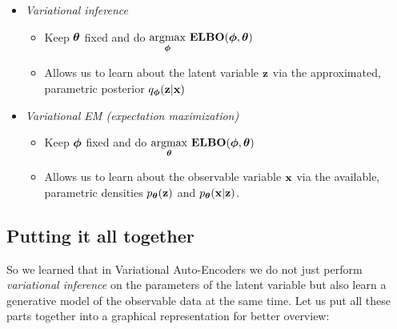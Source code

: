 \documentclass[11pt]{article}
\theoremstyle{definition}
\begin{document}
\begin{itemize}
	\item \textit{Variational inference}
	\begin{itemize}
		\item Keep $\boldsymbol{\theta}$ fixed and do $\underset{\boldsymbol{\phi}}{\mathrm{argmax}} \ \mathbf{ELBO} (\boldsymbol{\phi}, \boldsymbol{\theta})$
		\item Allows us to learn about the latent variable $\mathbf{z}$ via the approximated, parametric posterior $q_{\boldsymbol{\phi}}(\mathbf{z}|\mathbf{x})$
	\end{itemize}
	\item \textit{Variational EM (expectation maximization)}
	\begin{itemize}
		\item Keep $\boldsymbol{\phi}$ fixed and do $\underset{\boldsymbol{\theta}}{\mathrm{argmax}} \ \mathbf{ELBO} (\boldsymbol{\phi}, \boldsymbol{\theta})$
		\item Allows us to learn about the observable variable $\mathbf{x}$ via the available, parametric densities $p_{\boldsymbol{\theta}}(\mathbf{z})$ and $p_{\boldsymbol{\theta}}(\mathbf{x}|\mathbf{z})$.
	\end{itemize}
\end{itemize}

\subsection{Putting it all together}
So we learned that in Variational Auto-Encoders we do not just perform \textit{variational inference} on the parameters of the latent variable but also learn a generative model of the observable data at the same time. Let us put all these parts together into a graphical representation for better overview:
\end{document}
